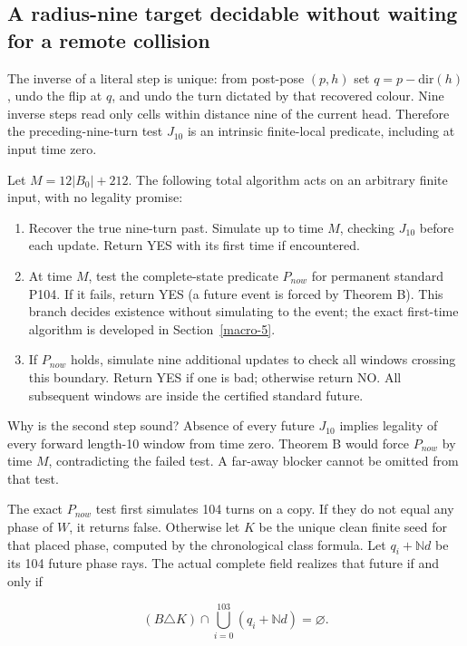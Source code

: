 \documentclass[
  11pt,
]{article}
\providecommand{\tightlist}{%
  \setlength{\itemsep}{0pt}\setlength{\parskip}{0pt}}
\begin{document}
\subsection{A radius-nine target decidable without waiting for a remote
collision}\label{ten-8}

The inverse of a literal step is unique: from post-pose \((p,h)\) set
\(q=p-\mathrm{dir}(h)\), undo the flip at \(q\), and undo the turn
dictated by that recovered colour. Nine inverse steps read only cells
within distance nine of the current head. Therefore the
preceding-nine-turn test \(J_{10}\) is an intrinsic finite-local
predicate, including at input time zero.

Let \(M=12|B_0|+212\). The following total algorithm acts on an
arbitrary finite input, with no legality promise:

\begin{enumerate}
\def\labelenumi{\arabic{enumi}.}
\tightlist
\item
  Recover the true nine-turn past. Simulate up to time \(M\), checking
  \(J_{10}\) before each update. Return YES with its first time if
  encountered.
\item
  At time \(M\), test the complete-state predicate \(P_{now}\) for
  permanent standard P104. If it fails, return YES (a future event is
  forced by Theorem B). This branch decides existence without simulating
  to the event; the exact first-time algorithm is developed in Section~\ref{macro-5}.
\item
  If \(P_{now}\) holds, simulate nine additional updates to check all
  windows crossing this boundary. Return YES if one is bad; otherwise
  return NO. All subsequent windows are inside the certified standard
  future.
\end{enumerate}

Why is the second step sound? Absence of every future \(J_{10}\) implies
legality of every forward length-10 window from time zero. Theorem B
would force \(P_{now}\) by time \(M\), contradicting the failed test. A
far-away blocker cannot be omitted from that test.

The exact \(P_{now}\) test first simulates 104 turns on a copy. If they
do not equal any phase of \(W\), it returns false. Otherwise let \(K\)
be the unique clean finite seed for that placed phase, computed by the
chronological class formula. Let \(q_i+\mathbb N d\) be its 104 future
phase rays. The actual complete field realizes that future if and only
if

\[(B\triangle K)\cap\bigcup_{i=0}^{103}(q_i+\mathbb N d)=\varnothing.\]
\end{document}
